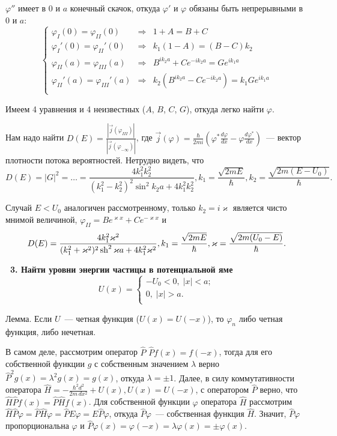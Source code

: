 \documentclass[a4paper,12pt]{article}
\begin{document}
$\varphi''$ имеет в $0$ и $a$ конечный скачок, откуда $\varphi'$ и $\varphi$
обязаны быть непрерывными в $0$ и $a$:
\[
  \left\{\begin{array}{lcl}
    \varphi_I(0)=\varphi_{II}(0)      &\Rightarrow&1+A=B+C\\
    \varphi_I'(0)=\varphi_{II}'(0)    &\Rightarrow&k_1(1-A)=(B-C)k_2\\
    \varphi_{II}(a)=\varphi_{III}(a)  &\Rightarrow&B^{ik_2a}+Ce^{-ik_2a}=
                                          Ge^{ik_1a}\\
    \varphi_{II}'(a)=\varphi_{III}'(a)&\Rightarrow&k_2(B^{ik_2a}-Ce^{-ik_2a})=
                                          k_1Ge^{ik_1a}\\
  \end{array}\right.
\]

Имеем 4 уравнения и 4 неизвестных ($A$, $B$, $C$, $G$), откуда легко
найти $\varphi$.

Нам надо найти
$D(E)=\frac{|\vec j(\varphi_{III})|}{|\vec j(\varphi_{-\infty})|}$,
где
$\vec j(\varphi)=\frac{\hbar}{2mi}\left(\varphi^*\frac {d\varphi}{dx}-
\varphi\frac{d\varphi^*}{dx}\right)$~--- вектор плотности потока
вероятностей. Нетрудно видеть, что
$$D(E)=|G|^2=\ldots
=\frac{4k_1^2k_2^2}{(k_1^2-k_2^2)^2\sin^2k_2a+4k_1^2k_2^2},
k_1=\frac{\sqrt{2mE}}\hbar, k_2=\frac{\sqrt{2m(E-U_0)}}\hbar.$$

Случай $E<U_0$ аналогичен рассмотренному, только $k_2=i\varkappa$ является
чисто мнимой величиной, $\varphi_{II}=Be^{\varkappa x}+Ce^{-\varkappa x}$ и
$$D(E)=\frac{4k_1^2\varkappa^2}
     {(k_1^2+\varkappa^2)^2\mathop{\rm sh}^2\varkappa a+4k_1^2\varkappa^2},
k_1=\frac{\sqrt{2mE}}\hbar, \varkappa=\frac{\sqrt{2m(U_0-E)}}\hbar.$$

\noindent\textbf{~3. Найти уровни энергии частицы в потенциальной яме
\[
U\left( x \right) = \left\{ {\begin{array}{l}
 - U_0 < 0,\;\left| x \right| < a; \\
 0,\;\left| x \right| > a. \\
 \end{array}} \right.
\]}

Лемма. Если $U$~--- четная функция ($U(x)=U(-x)$), то $\varphi_n$ либо
четная функция, либо нечетная.

В самом деле, рассмотрим оператор $\hat P$ $\hat Pf(x)=f(-x)$, тогда для
его собственной функции $g$ с собственным значением $\lambda$ верно
$\hat P^2g(x)=\lambda^2g(x)=g(x)$, откуда $\lambda=\pm1$. Далее, в силу
коммутативности оператора $\hat H=-\frac{\hbar^2d^2}{2m\,dx^2}+U(x),
U(x)=U(-x)$, с оператором $\hat P$ верно, что $\hat H\hat Pf(x)=
\hat P\hat Hf(x)$. Для собственной функции $\varphi$ оператора $\hat H$
рассмотрим
$\hat H\hat P\varphi=\hat P\hat H\varphi=\hat PE\varphi=E\hat P\varphi$,
откуда $\hat P\varphi$~--- собственная функция $\hat H$. Значит,
$\hat P\varphi$ пропорциональна $\varphi$ и
$\hat P\varphi(x)=\varphi(-x)=\lambda\varphi(x)=\pm\varphi(x)$.
\end{document}
